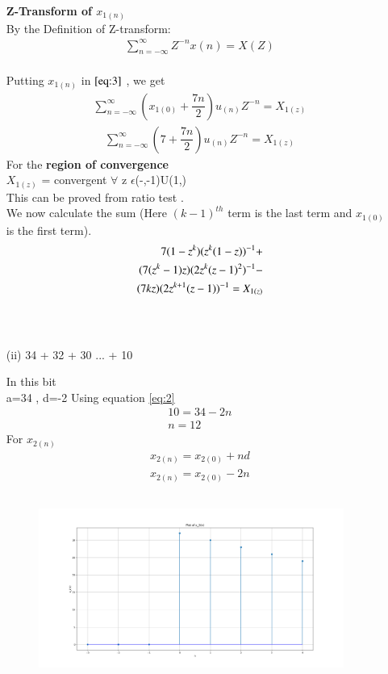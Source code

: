 \documentclass[journal,12pt,twocolumn]{IEEEtran}
\theoremstyle{remark}
\begin{document}
\begin{enumerate}
\textbf{Z-Transform of $x_{1(n)}$}\\
\vspace{0.2cm}
By the Definition of Z-transform:
\begin{align}
 \sum_{n=-\infty}^{\infty} Z^{-n}x(n) = X(Z)\label{eq:3}
 \end{align}
\\Putting $x_{1(n)}$ in $\eqref{eq:3}$ , we get \\
\begin{align}
     \sum_{n=-\infty}^{\infty}(x_{1(0)} + \dfrac{7n}{2})u_{(n)}Z^{-n} =X_{1(z)}
\end{align}
\begin{align}
\sum_{n=-\infty}^{\infty}(7 + \dfrac{7n}{2})u_{(n)}Z^{-n} =X_{1(z)}
\end{align}
For the \textbf{region of convergence}\\
$X_{1(z)}$ = convergent $\forall$ z $\epsilon$(-\infty,-1)U(1,\infty)
\\

This can be proved from ratio test . \\
We now calculate the sum (Here $(k-1)^{th}$ term is the last term and  $x_{1(0)}$ is the first term).
\begin{align}
   \notag 7(1-z^k)(z^k(1-z))^{-1}+
   \\ \notag(7(z^k-1)z)(2z^k(z-1)^2)^{-1}-\\ (7kz)(2z^{k+1}(z-1))^{-1}=X_{1(z)}
\end{align}
\\
\\
\vspace{0.5cm}
\item[(ii)]
 34 + 32 + 30 ... + 10\\
\vspace{0.2cm}

In this bit \\ a=34 , d=-2
Using equation \eqref{eq:2}
\begin{align}
     10 = 34 -2n\\
     n=12 
     \end{align}
For $x_{2(n)}$
\begin{align}
x_{2(n)} = x_{2(0)} + nd\\
x_{2(n)} = x_{2(0)} -2n
\end{align}

\begin{figure}[!ht]
\centering
  \graphicspath{ {figs/} }
\includegraphics[width=10cm, height=6cm]{graph_2}
\label{graph:3}
\end{figure}


\end{enumerate}
\end{document}
